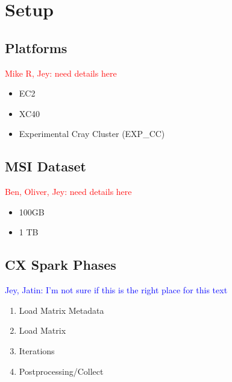 \section{Setup}
\label{sec:setup}

\subsection{Platforms}
\textcolor{red}{Mike R, Jey: need details here}
\begin{itemize}
  \item EC2
  \item XC40
  \item Experimental Cray Cluster (EXP\_CC)
\end{itemize}

\subsection{MSI Dataset}
\textcolor{red}{Ben, Oliver, Jey: need details here}
\begin{itemize}
  \item 100GB
  \item 1 TB
\end{itemize}

\subsection{CX Spark Phases}
\textcolor{blue}{Jey, Jatin: I'm not sure if this is the right place for this text}
 \begin{enumerate}
      \item Load Matrix Metadata
      \item Load Matrix
      \item Iterations
      \item Postprocessing/Collect
 \end{enumerate}

